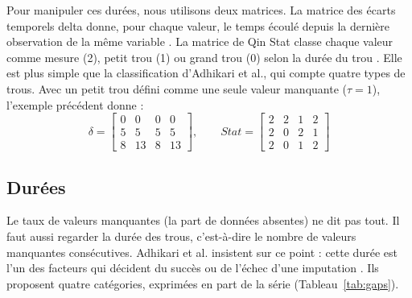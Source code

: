 Pour manipuler ces durées, nous utilisons deux matrices. La matrice des écarts temporels \gls{delta} donne, pour chaque valeur, le temps écoulé depuis la dernière observation de la même variable \cite{Fang_2020}. La matrice de Qin \gls{Stat} classe chaque valeur comme mesure (2), petit trou (1) ou grand trou (0) selon la durée du trou \cite{Qin_2007}. Elle est plus simple que la classification d'Adhikari et al., qui compte quatre types de trous. Avec un petit trou défini comme une seule valeur manquante ($\tau = 1$), l'exemple précédent donne :
\begin{equation}
\delta = \begin{bmatrix}
0 & 0 & 0 & 0 \\
5 & 5 & 5 & 5 \\
8 & 13 & 8 & 13
\end{bmatrix},
\qquad
\mathit{Stat} = \begin{bmatrix}
2 & 2 & 1 & 2 \\
2 & 0 & 2 & 1 \\
2 & 0 & 1 & 2
\end{bmatrix}
\end{equation}




\subsection{Durées}

Le taux de valeurs manquantes (la part de données absentes) ne dit pas tout. Il faut aussi regarder la durée des trous, c’est-à-dire le nombre de valeurs manquantes consécutives. 
Adhikari et al. insistent sur ce point : cette durée est l’un des facteurs qui décident du succès ou de l’échec d’une imputation \cite{Adhikari_2023}. 
Ils proposent quatre catégories, exprimées en part de la série (Tableau~\ref{tab:gaps}).


